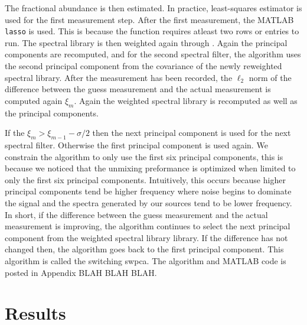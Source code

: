 The fractional abundance is then estimated. In practice, least-squares estimator is used for the first measurement step. After the first measurement, the MATLAB \texttt{lasso} is used. This is because the function requires atleast two rows or entries to run. The spectral library is then weighted again through . Again the principal components are recomputed, and for the second spectral filter, the algorithm uses the second principal component from the covariance of the newly reweighted spectral library. After the measurement has been recorded, the  $\ell_2$ norm of the difference between the guess measurement and the actual measurement is computed again $\xi_m$. Again the weighted spectral library is recomputed as well as the principal components. 

If the $\xi_m > \xi_{m-1} - {\sigma}/{2}$ then the next principal component is used for the next spectral filter. Otherwise the first principal component is used again.  We constrain the algorithm to only use the first six principal components, this is because we noticed that the unmixing preformance is optimized when limited to only the first six principal components. Intuitively, this occurs because higher principal components tend be higher frequency where noise begins to dominate the signal and the spectra generated by our sources tend to be lower frequency. In short, if the difference between the guess measurement and the actual measurement is improving, the algorithm continues to select the next principal component from the weighted spectral library library. If the difference has not changed then, the algorithm goes back to the first principal component. This algorithm is called the switching \gls{swpca}. The algorithm and MATLAB code is posted in Appendix BLAH BLAH BLAH. 




\section{Results}




